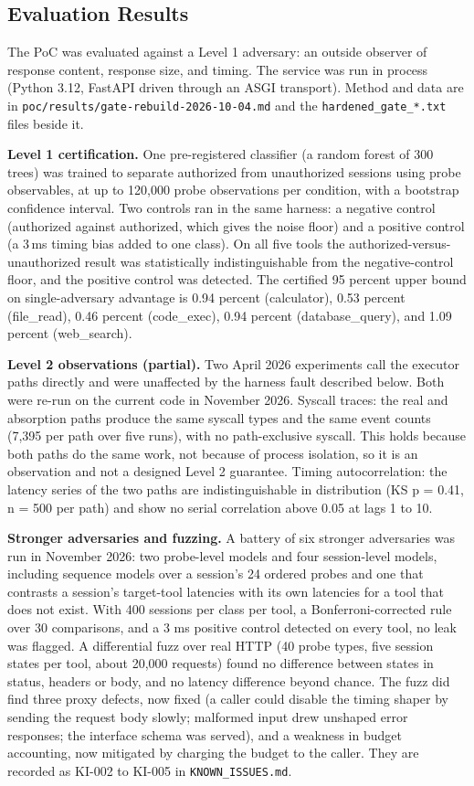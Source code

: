 \documentclass[11pt,a4paper]{article}
\begin{document}
\subsection{Evaluation Results}

The PoC was evaluated against a Level 1 adversary: an outside observer of response content, response size, and timing. The service was run in process (Python 3.12, FastAPI driven through an ASGI transport). Method and data are in \texttt{poc/results/gate-rebuild-2026-10-04.md} and the \texttt{hardened\_gate\_*.txt} files beside it.

\textbf{Level 1 certification.} One pre-registered classifier (a random forest of 300 trees) was trained to separate authorized from unauthorized sessions using probe observables, at up to 120{,}000 probe observations per condition, with a bootstrap confidence interval. Two controls ran in the same harness: a negative control (authorized against authorized, which gives the noise floor) and a positive control (a 3\,ms timing bias added to one class). On all five tools the authorized-versus-unauthorized result was statistically indistinguishable from the negative-control floor, and the positive control was detected. The certified 95 percent upper bound on single-adversary advantage is 0.94 percent (calculator), 0.53 percent (file\_read), 0.46 percent (code\_exec), 0.94 percent (database\_query), and 1.09 percent (web\_search).

\textbf{Level 2 observations (partial).} Two April 2026 experiments call the executor paths directly and were unaffected by the harness fault described below. Both were re-run on the current code in November 2026. Syscall traces: the real and absorption paths produce the same syscall types and the same event counts (7{,}395 per path over five runs), with no path-exclusive syscall. This holds because both paths do the same work, not because of process isolation, so it is an observation and not a designed Level 2 guarantee. Timing autocorrelation: the latency series of the two paths are indistinguishable in distribution (KS p = 0.41, n = 500 per path) and show no serial correlation above 0.05 at lags 1 to 10.

\textbf{Stronger adversaries and fuzzing.} A battery of six stronger adversaries was run in November 2026: two probe-level models and four session-level models, including sequence models over a session's 24 ordered probes and one that contrasts a session's target-tool latencies with its own latencies for a tool that does not exist. With 400 sessions per class per tool, a Bonferroni-corrected rule over 30 comparisons, and a 3 ms positive control detected on every tool, no leak was flagged. A differential fuzz over real HTTP (40 probe types, five session states per tool, about 20{,}000 requests) found no difference between states in status, headers or body, and no latency difference beyond chance. The fuzz did find three proxy defects, now fixed (a caller could disable the timing shaper by sending the request body slowly; malformed input drew unshaped error responses; the interface schema was served), and a weakness in budget accounting, now mitigated by charging the budget to the caller. They are recorded as KI-002 to KI-005 in \texttt{KNOWN\_ISSUES.md}.
\end{document}
